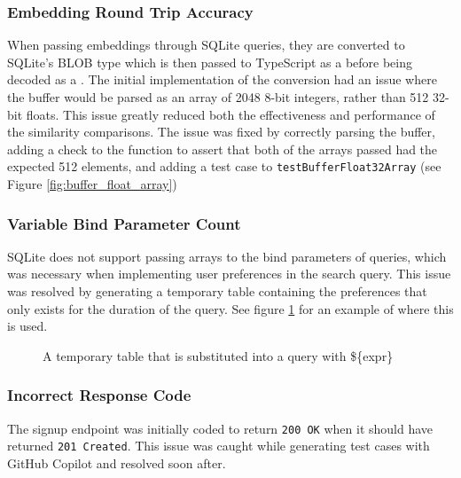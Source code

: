 \subsubsection{Embedding Round Trip Accuracy}\label{sec:embedding_round_trip}
When passing embeddings through SQLite queries, they are converted to SQLite's BLOB type which is then passed to TypeScript as a 
before being decoded as a .
The initial implementation of the conversion had an issue where the buffer would be parsed as an array of 2048 8-bit integers,
rather than 512 32-bit floats. This issue greatly reduced both the effectiveness and performance of the similarity comparisons.
The issue was fixed by correctly parsing the buffer, adding a check to the  function to assert
that both of the arrays passed had the expected 512 elements, and adding a test case to
\texttt{testBufferFloat32Array} (see Figure \ref{fig:buffer_float_array})

\subsubsection{Variable Bind Parameter Count}\label{sec:variable_bind_count}
SQLite does not support passing arrays to the bind parameters of queries, which was
necessary when implementing user preferences in the search query. This issue
was resolved by generating a temporary table containing the preferences
that only exists for the duration of the query. See figure \ref{fig:temp_table_substitution}
for an example of where this is used.

\begin{figure}[h]
    \caption{\label{fig:temp_table_substitution}A temporary table that is substituted into a query with \$\{expr\}}
    \raggedright

\end{figure}

\subsubsection{Incorrect Response Code}
The signup endpoint was initially coded to return \texttt{200 OK} when it should have returned
\texttt{201 Created}. This issue was caught while generating test cases with GitHub Copilot and resolved
soon after.

